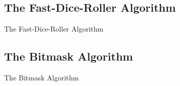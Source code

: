 \subsection{The Fast-Dice-Roller Algorithm}
\begin{frame}{The Fast-Dice-Roller Algorithm}
    \pause 

\end{frame}



\subsection{The Bitmask Algorithm}
\begin{frame}{The Bitmask Algorithm}
    \pause 
    

\end{frame}